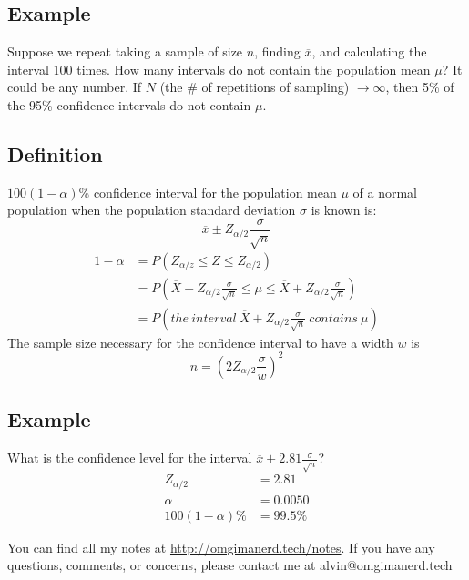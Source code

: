 \documentclass[letterpaper, 12pt]{math}
\begin{document}
\subsection*{Example}
Suppose we repeat taking a sample of size \( n \), finding \( \overline{x} \),
and calculating the interval 100 times. How many intervals do not contain the
population mean \( \mu \)? It could be any number. If \( N \) (the \# of
repetitions of sampling) \( \to\infty \), then 5\% of the 95\% confidence
intervals do not contain \( \mu \).

\subsection*{Definition}
\( 100(1-\alpha)\% \) confidence interval for the population mean \( \mu \) of
a normal population when the population standard deviation \( \sigma \) is known
is:
\[ \overline{x}\pm Z_{\alpha/2}\frac{\sigma}{\sqrt{n}} \]
\begin{align*}
  1-\alpha &= P(Z_{\alpha/z}\leq Z\leq Z_{\alpha/2}) \\
  &= P(\overline{X}-Z_{\alpha/2}\frac{\sigma}{\sqrt{n}}\leq \mu\leq
    \overline{X}+Z_{\alpha/2}\frac{\sigma}{\sqrt{n}}) \\
  &= P(the\ interval\ \overline{X}+Z_{\alpha/2}\frac{\sigma}{\sqrt{n}}
    \ contains\ \mu)
\end{align*}
The sample size necessary for the confidence interval to have a width \( w \)
is
\[ n = (2Z_{\alpha/2}\frac{\sigma}{w})^{2} \]

\subsection*{Example}
What is the confidence level for the interval \( \overline{x}\pm2.81
\frac{\sigma}{\sqrt{n}} \)?
\begin{align*}
  Z_{\alpha/2} &= 2.81 \\
  \alpha &= 0.0050 \\
  100(1-\alpha)\% &= 99.5\%
\end{align*}

\begin{center}
  You can find all my notes at \url{http://omgimanerd.tech/notes}. If you have
  any questions, comments, or concerns, please contact me at
  alvin@omgimanerd.tech
\end{center}
\end{document}
